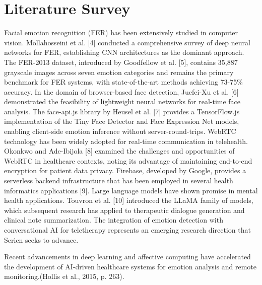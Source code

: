 \documentclass[conference]{IEEEtran}
\begin{document}
\section{Literature Survey}
Facial emotion recognition (FER) has been extensively studied in computer vision. Mollahosseini et al. [4] conducted a comprehensive survey of deep neural networks for FER, establishing CNN architectures as the dominant approach. The FER-2013 dataset, introduced by Goodfellow et al. [5], contains 35,887 grayscale images across seven emotion categories and remains the primary benchmark for FER systems, with state-of-the-art methods achieving 73-75\% accuracy.
In the domain of browser-based face detection, Juefei-Xu et al. [6] demonstrated the feasibility of lightweight neural networks for real-time face analysis. The face-api.js library by Heusel et al. [7] provides a TensorFlow.js implementation of the Tiny Face Detector and Face Expression Net models, enabling client-side emotion inference without server-round-trips.
WebRTC technology has been widely adopted for real-time communication in telehealth. Okonkwo and Ade-Ibijola [8] examined the challenges and opportunities of WebRTC in healthcare contexts, noting its advantage of maintaining end-to-end encryption for patient data privacy. Firebase, developed by Google, provides a serverless backend infrastructure that has been employed in several health informatics applications [9].
Large language models have shown promise in mental health applications. Touvron et al. [10] introduced the LLaMA family of models, which subsequent research has applied to therapeutic dialogue generation and clinical note summarization. The integration of emotion detection with conversational AI for teletherapy represents an emerging research direction that Serien seeks to advance.
\begin{table}[t]
\caption{Summary of Literature Survey}
\centering
\small
\setlength{\tabcolsep}{4pt}
\renewcommand{\arraystretch}{1.15}
\end{table}
Recent advancements in deep learning and affective computing have accelerated the development of AI-driven healthcare systems for emotion analysis and remote monitoring.(Hollis et al., 2015, p. 263).
\end{document}
